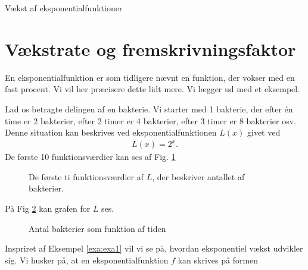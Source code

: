 
\begin{center}
\Huge
Vækst af eksponentialfunktioner
\end{center}
\section*{Vækstrate og fremskrivningsfaktor}

En eksponentialfunktion er som tidligere nævnt en funktion, der vokser med en fast procent. Vi vil her præcisere dette lidt mere. Vi lægger ud med et eksempel.
\begin{exa}\label{exa:exa1}
Lad os betragte delingen af en bakterie. Vi starter med 1 bakterie, der efter én time er 2 bakterier, efter 2 timer er 4 bakterier, efter 3 timer er 8 bakterier osv. Denne situation kan beskrives ved eksponentialfunktionen $L(x)$ givet ved
\begin{align*}
L(x) = 2^x.
\end{align*}
De første 10 funktionsværdier kan ses af Fig. \ref{fig:sildebenfold}
\begin{figure}[H]
\center
{}
\caption{De første ti funktionsværdier af $L$, der beskriver antallet af bakterier. }
\label{fig:sildebenfold}
\end{figure}
På Fig \ref{fig:flagxfold} kan grafen for $L$ ses. 
\begin{figure}[H]
\center
{}
\caption{Antal bakterier som funktion af tiden}
\label{fig:flagxfold}
\end{figure}
\end{exa}
Inspriret af Eksempel \ref{exa:exa1} vil vi se på, hvordan eksponentiel vækst udvikler sig. Vi husker på, at en eksponentialfunktion $f$ kan skrives på formen
